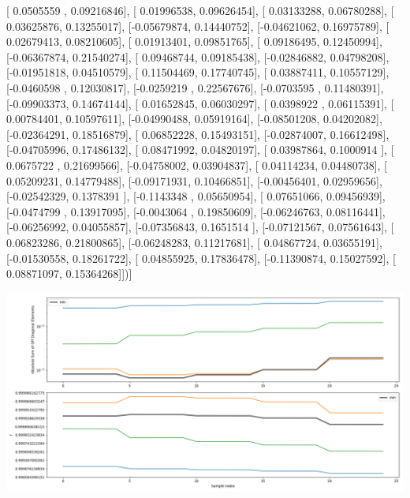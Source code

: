 \documentclass{article}
\begin{document}
       [ 0.0505559 ,  0.09216846],
       [ 0.01996538,  0.09626454],
       [ 0.03133288,  0.06780288],
       [ 0.03625876,  0.13255017],
       [-0.05679874,  0.14440752],
       [-0.04621062,  0.16975789],
       [ 0.02679413,  0.08210605],
       [ 0.01913401,  0.09851765],
       [ 0.09186495,  0.12450994],
       [-0.06367874,  0.21540274],
       [ 0.09468744,  0.09185438],
       [-0.02846882,  0.04798208],
       [-0.01951818,  0.04510579],
       [ 0.11504469,  0.17740745],
       [ 0.03887411,  0.10557129],
       [-0.0460598 ,  0.12030817],
       [-0.0259219 ,  0.22567676],
       [-0.0703595 ,  0.11480391],
       [-0.09903373,  0.14674144],
       [ 0.01652845,  0.06030297],
       [ 0.0398922 ,  0.06115391],
       [ 0.00784401,  0.10597611],
       [-0.04990488,  0.05919164],
       [-0.08501208,  0.04202082],
       [-0.02364291,  0.18516879],
       [ 0.06852228,  0.15493151],
       [-0.02874007,  0.16612498],
       [-0.04705996,  0.17486132],
       [ 0.08471992,  0.04820197],
       [ 0.03987864,  0.1000914 ],
       [ 0.0675722 ,  0.21699566],
       [-0.04758002,  0.03904837],
       [ 0.04114234,  0.04480738],
       [ 0.05209231,  0.14779488],
       [-0.09171931,  0.10466851],
       [-0.00456401,  0.02959656],
       [-0.02542329,  0.1378391 ],
       [-0.1143348 ,  0.05650954],
       [ 0.07651066,  0.09456939],
       [-0.0474799 ,  0.13917095],
       [-0.0043064 ,  0.19850609],
       [-0.06246763,  0.08116441],
       [-0.06256992,  0.04055857],
       [-0.07356843,  0.1651514 ],
       [-0.07121567,  0.07561643],
       [ 0.06823286,  0.21800865],
       [-0.06248283,  0.11217681],
       [ 0.04867724,  0.03655191],
       [-0.01530558,  0.18261722],
       [ 0.04855925,  0.17836478],
       [-0.11390874,  0.15027592],
       [ 0.08871097,  0.15364268]])]
\begin{center}
\includegraphics[scale=.9]{report_pickled_controls200/control_dpn_all.png}

\end{center}
\end{document}
